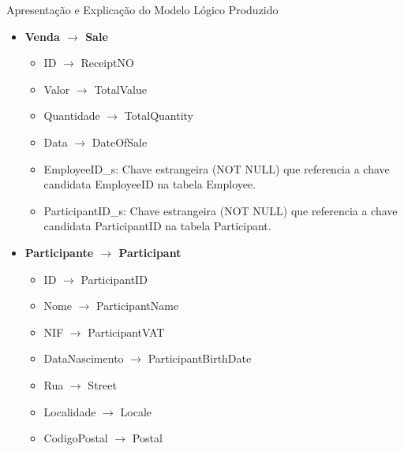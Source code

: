 \documentclass[compress,svgnames,handout,13.7pt]{beamer}
\begin{document}
\begin{frame}{Apresentação e Explicação do Modelo Lógico Produzido}
        \begin{itemize}
        \item{\textbf{Venda $\rightarrow$ Sale}}
            \begin{itemize}
                \item{ID $\rightarrow$ ReceiptNO}
                \item{Valor $\rightarrow$ TotalValue}
                \item{Quantidade $\rightarrow$ TotalQuantity}
                \item{Data $\rightarrow$ DateOfSale}
                \item{EmployeeID\_s:} Chave estrangeira (NOT NULL) que referencia a chave candidata EmployeeID na tabela Employee.
                \item{ParticipantID\_s:} Chave estrangeira (NOT NULL) que referencia a chave candidata ParticipantID na tabela Participant.
            \end{itemize}
        \item{\textbf{Participante $\rightarrow$ Participant}}
            \begin{itemize}
                \item{ID $\rightarrow$ ParticipantID}
                \item{Nome $\rightarrow$ ParticipantName}
                \item{NIF $\rightarrow$ ParticipantVAT}
                \item{DataNascimento $\rightarrow$ ParticipantBirthDate}
                \item{Rua $\rightarrow$ Street}
                \item{Localidade $\rightarrow$ Locale}
                \item{CodigoPostal $\rightarrow$ Postal}
            \end{itemize}
        \end{itemize}
\end{frame}
\end{document}
